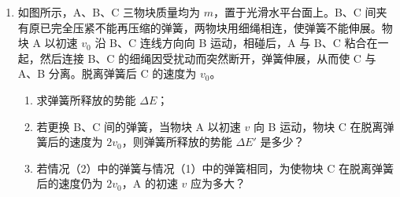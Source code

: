 \documentclass[\gkver]{gaokaozhenti}
\begin{document}
\begin{enumerate}
{评分标准：（1）4 分。正确求出 $r_{1}$、$r_{2}$ 各 2 分。

（2）8 分。画出光路示意图得 2 分，正确列出①式（或②式）得 3 分。正确得出结果（③式）得 3 分。
}

\item
如图所示，A、B、C 三物块质量均为 $m$，置于光滑水平台面上。B、C 间夹有原已完全压紧不能再压缩的弹簧，两物块用细绳相连，使弹簧不能伸展。物块 A 以初速 $v_{0}$ 沿 B、C 连线方向向 B 运动，相碰后，A 与 B、C 粘合在一起，然后连接 B、C 的细绳因受扰动而突然断开，弹簧伸展，从而使 C 与 A、B 分离。脱离弹簧后 C 的速度为 $v_{0}$。
\begin{enumerate}
	\item
	求弹簧所释放的势能 $\Delta E$；
	\item
	若更换 B、C 间的弹簧，当物块 A 以初速 $v$ 向 B 运动，物块 C 在脱离弹簧后的速度为 $2v_{0}$，则弹簧所释放的势能 $\Delta E'$ 是多少？
	\item
	若情况（2）中的弹簧与情况（1）中的弹簧相同，为使物块 C 在脱离弹簧后的速度仍为 $2v_{0}$，A 的初速 $v$ 应为多大？
\end{enumerate}
\onepicture[align=right, w=5.99cm]{}
\end{enumerate}
\end{document}
